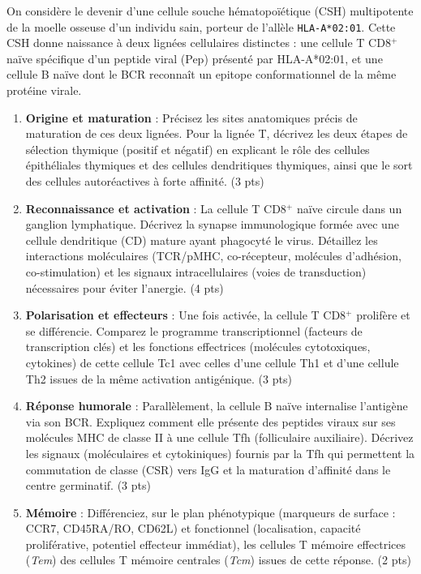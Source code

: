 \documentclass[11pt]{article}
\begin{document}
\begin{exercice}
On considère le devenir d'une cellule souche hématopoïétique (CSH) multipotente de la moelle osseuse d'un individu sain, porteur de l'allèle \texttt{HLA-A*02:01}. Cette CSH donne naissance à deux lignées cellulaires distinctes : une cellule T CD8$^+$ naïve spécifique d'un peptide viral (Pep) présenté par HLA-A*02:01, et une cellule B naïve dont le BCR reconnaît un epitope conformationnel de la même protéine virale.

\begin{enumerate}
    \item \textbf{Origine et maturation} : Précisez les sites anatomiques précis de maturation de ces deux lignées. Pour la lignée T, décrivez les deux étapes de sélection thymique (positif et négatif) en explicant le rôle des cellules épithéliales thymiques et des cellules dendritiques thymiques, ainsi que le sort des cellules autoréactives à forte affinité. (3 pts)
    \item \textbf{Reconnaissance et activation} : La cellule T CD8$^+$ naïve circule dans un ganglion lymphatique. Décrivez la synapse immunologique formée avec une cellule dendritique (CD) mature ayant phagocyté le virus. Détaillez les interactions moléculaires (TCR/pMHC, co-récepteur, molécules d'adhésion, co-stimulation) et les signaux intracellulaires (voies de transduction) nécessaires pour éviter l'anergie. (4 pts)
    \item \textbf{Polarisation et effecteurs} : Une fois activée, la cellule T CD8$^+$ prolifère et se différencie. Comparez le programme transcriptionnel (facteurs de transcription clés) et les fonctions effectrices (molécules cytotoxiques, cytokines) de cette cellule Tc1 avec celles d'une cellule Th1 et d'une cellule Th2 issues de la même activation antigénique. (3 pts)
    \item \textbf{Réponse humorale} : Parallèlement, la cellule B naïve internalise l'antigène via son BCR. Expliquez comment elle présente des peptides viraux sur ses molécules MHC de classe II à une cellule Tfh (folliculaire auxiliaire). Décrivez les signaux (moléculaires et cytokiniques) fournis par la Tfh qui permettent la commutation de classe (CSR) vers IgG et la maturation d'affinité dans le centre germinatif. (3 pts)
    \item \textbf{Mémoire} : Différenciez, sur le plan phénotypique (marqueurs de surface : CCR7, CD45RA/RO, CD62L) et fonctionnel (localisation, capacité proliférative, potentiel effecteur immédiat), les cellules T mémoire effectrices (\textit{Tem}) des cellules T mémoire centrales (\textit{Tcm}) issues de cette réponse. (2 pts)
\end{enumerate}
\end{exercice}
\end{document}
